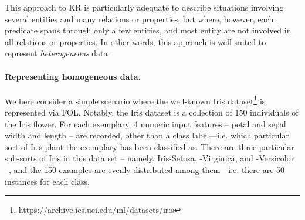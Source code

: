 \documentclass[12pt,a4paper,openright,twoside]{book}
\begin{document}
This approach to KR is particularly adequate to describe situations involving several entities and many relations or properties, but where, however, each predicate spans through only a few entities, and most entity are not involved in all relations or properties. 
%
In other words, this approach is well suited to represent \emph{heterogeneous} data.

\paragraph{Representing homogeneous data.}

We here consider a simple scenario where the well-known Iris dataset\footnote{\url{https://archive.ics.uci.edu/ml/datasets/iris}} is represented via FOL.
%
Notably, the Iris dataset is a collection of 150 individuals of the Iris flower.
%
For each exemplary, 4 numeric input features -- petal and sepal width and length -- are recorded, other than a class label---i.e. which particular sort of Iris plant the exemplary has been classified as.
%
There are three particular sub-sorts of Iris in this data set -- namely, Iris-Setosa, -Virginica, and -Versicolor --, and the 150 examples are evenly distributed among them---i.e. there are 50 instances for each class.
\end{document}
